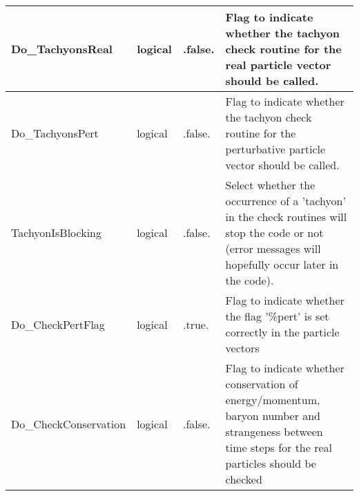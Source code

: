 \documentclass{article}
\begin{document}
\begin{longtable}{llll}
\midrule
Do\_TachyonsReal & \begin{minipage}[t]{2cm}logical\end{minipage} & \begin{minipage}[t]{2cm}.false.\end{minipage} & \begin{minipage}[t]{12cm}Flag to indicate whether the tachyon check routine for the real particle vector should be called.\end{minipage}\\*
\midrule
Do\_TachyonsPert & \begin{minipage}[t]{2cm}logical\end{minipage} & \begin{minipage}[t]{2cm}.false.\end{minipage} & \begin{minipage}[t]{12cm}Flag to indicate whether the tachyon check routine for the perturbative particle vector should be called.\end{minipage}\\*
\midrule
TachyonIsBlocking & \begin{minipage}[t]{2cm}logical\end{minipage} & \begin{minipage}[t]{2cm}.false.\end{minipage} & \begin{minipage}[t]{12cm}Select whether the occurrence of a 'tachyon' in the check routines will stop the code or not (error messages will hopefully occur later in the code).\end{minipage}\\*
\midrule
Do\_CheckPertFlag & \begin{minipage}[t]{2cm}logical\end{minipage} & \begin{minipage}[t]{2cm}.true.\end{minipage} & \begin{minipage}[t]{12cm}Flag to indicate whether the flag '\%pert' is set correctly in the particle vectors\end{minipage}\\*
\midrule
Do\_CheckConservation & \begin{minipage}[t]{2cm}logical\end{minipage} & \begin{minipage}[t]{2cm}.false.\end{minipage} & \begin{minipage}[t]{12cm}Flag to indicate whether conservation of energy/momentum, baryon number and strangeness between time steps for the real particles should be checked\end{minipage}\\*
\bottomrule
\end{longtable}
{ }
\end{document}
